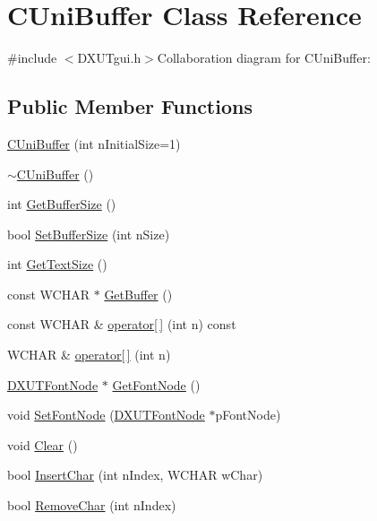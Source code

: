 \hypertarget{class_c_uni_buffer}{
\section{CUniBuffer Class Reference}
\label{class_c_uni_buffer}
}


{\ttfamily \#include $<$DXUTgui.h$>$}Collaboration diagram for CUniBuffer:\subsection*{Public Member Functions}
\begin{DoxyCompactItemize}
\item 
\hyperlink{class_c_uni_buffer_af89473fb3587314c4b3d773f0ed4fde1}{CUniBuffer} (int nInitialSize=1)
\item 
\hyperlink{class_c_uni_buffer_ab8612aea115b768b9927239c2e9568d0}{$\sim$CUniBuffer} ()
\item 
int \hyperlink{class_c_uni_buffer_acba24481f6d469d762e0c39f31eba80d}{GetBufferSize} ()
\item 
bool \hyperlink{class_c_uni_buffer_ac1584ce27e2969eb9a33159a15d0b1e6}{SetBufferSize} (int nSize)
\item 
int \hyperlink{class_c_uni_buffer_a2e50dad415c9fa8ef56926b76500f7a3}{GetTextSize} ()
\item 
const WCHAR $\ast$ \hyperlink{class_c_uni_buffer_a0a2a93af329ebeedcea0cf67b166fd8f}{GetBuffer} ()
\item 
const WCHAR \& \hyperlink{class_c_uni_buffer_a1d875e8c38094170c15cb551817bbedf}{operator\mbox{[}$\,$\mbox{]}} (int n) const 
\item 
WCHAR \& \hyperlink{class_c_uni_buffer_ae763d81a4be9f18f82dcf389184892b7}{operator\mbox{[}$\,$\mbox{]}} (int n)
\item 
\hyperlink{struct_d_x_u_t_font_node}{DXUTFontNode} $\ast$ \hyperlink{class_c_uni_buffer_a8c781a0b6673cb2e1c0fd67e9bdcebb5}{GetFontNode} ()
\item 
void \hyperlink{class_c_uni_buffer_abfc7664ed4c8da9b254dc75137da17b3}{SetFontNode} (\hyperlink{struct_d_x_u_t_font_node}{DXUTFontNode} $\ast$pFontNode)
\item 
void \hyperlink{class_c_uni_buffer_a6939a6f250ac4d32314e2124f17a037f}{Clear} ()
\item 
bool \hyperlink{class_c_uni_buffer_a23dfb66bd7d577ca78d55f387945b635}{InsertChar} (int nIndex, WCHAR wChar)
\item 
bool \hyperlink{class_c_uni_buffer_a2b0be4cc48030eab8027b9c27c11b3ba}{RemoveChar} (int nIndex)

\end{DoxyCompactItemize}
